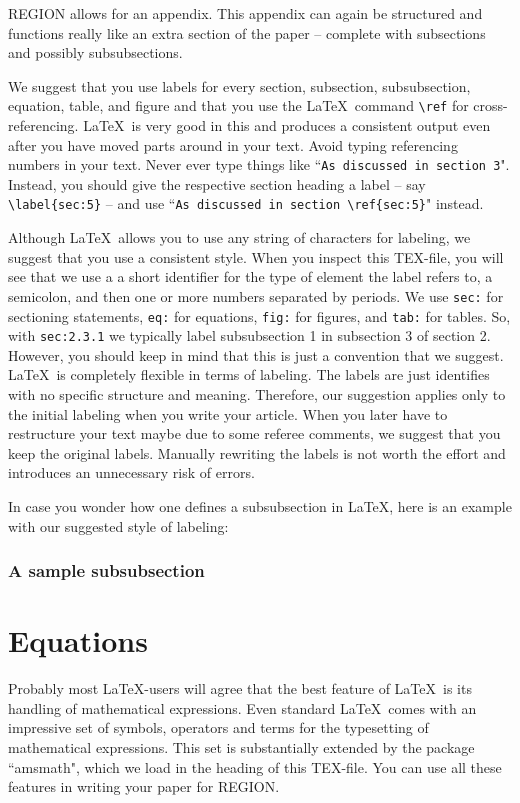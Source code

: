 \documentclass[a4paper,twoside]{article}
\begin{document}
REGION allows for an appendix. This appendix can again be structured and functions really like an extra section of the paper -- complete with subsections and possibly subsubsections.

We suggest that you use labels for every section, subsection, subsubsection, equation, table, and figure and that you use the \LaTeX\ command \verb|\ref| for cross-referencing. \LaTeX\ is very good in this and produces a consistent output even after you have moved parts around in your text. Avoid typing referencing numbers in your text. Never ever type things like ``\verb|As discussed in section 3|". Instead, you should give the respective section heading a label -- say \verb|\label{sec:5}| -- and use ``\verb|As discussed in section \ref{sec:5}|" instead.  

Although \LaTeX\ allows you to use any string of characters for labeling, we suggest that you use a consistent style. When you inspect this TEX-file, you will see that we use a a short identifier for the type of element the label refers to, a semicolon, and then one or more numbers separated by periods. We use \verb|sec:| for sectioning statements, \verb|eq:| for equations, \verb|fig:| for figures, and \verb|tab:| for tables. So, with \verb|sec:2.3.1| we typically label subsubsection 1 in subsection 3 of section 2. However, you should keep in mind that this is just a convention that we suggest. \LaTeX\ is completely flexible in terms of labeling. The labels are just identifies with no specific structure and meaning. Therefore, our suggestion applies only to the initial labeling when you write your article. When you later have to restructure your text maybe due to some referee comments, we suggest that you keep the original labels. Manually rewriting the labels is not worth the effort and introduces an unnecessary risk of errors.

In case you wonder how one defines a subsubsection in \LaTeX, here is an example with our suggested style of labeling:

\subsubsection{A sample subsubsection}
\label{sec:2.2.1}


\section{Equations}
\label{sec:3}

Probably most \LaTeX-users will agree that the best feature of \LaTeX\ is its handling of mathematical expressions. Even standard \LaTeX\ comes with an impressive set of symbols, operators and terms for the typesetting of mathematical expressions. This set is substantially extended by the package ``amsmath", which we load in the heading of this TEX-file. You can use all these features in writing your paper for REGION. 
\end{document}
